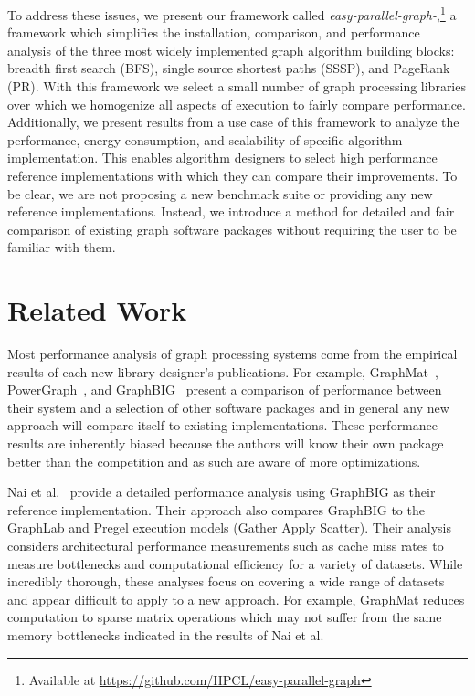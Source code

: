 \documentclass[conference]{IEEEtran}
\begin{document}
To address these issues, we present our framework called \mbox{\emph{easy-parallel-graph-\textasteriskcentered}},\footnote{Available at \url{https://github.com/HPCL/easy-parallel-graph}} a framework which simplifies the installation, comparison, and performance analysis of the three most widely implemented graph algorithm building blocks: breadth first search (BFS), single source shortest paths (SSSP), and PageRank (PR). With this framework we select a small number of graph processing libraries over which we homogenize all aspects of execution to fairly compare performance. Additionally, we present results from a use case of this framework to analyze the performance, energy consumption, and scalability of specific algorithm implementation. This enables algorithm designers to select high performance reference implementations with which they can compare their improvements. To be clear, we are not proposing a new benchmark suite or providing any new reference implementations. Instead, we introduce a method for detailed and fair comparison of existing graph software packages without requiring the user to be familiar with them.

\section{Related Work}\label{sec:relatedwork}
Most performance analysis of graph processing systems come from the empirical results of each new library designer's publications. For example, GraphMat~\cite{Sundaram:2015:GraphMat}, PowerGraph~\cite{Gonzalez:2012:Powergraph}, and GraphBIG~\cite{Nai:2015:Graphbig} present a comparison of performance between their system and a selection of other software packages and in general any new approach will compare itself to existing implementations. These performance results are inherently biased because the authors will know their own package better than the competition and as such are aware of more optimizations.

Nai et al.~\cite{Nai:2016:architectural} provide a detailed performance analysis using GraphBIG as their reference implementation. Their approach also compares GraphBIG to the GraphLab and Pregel execution models (Gather Apply Scatter). Their analysis considers architectural performance measurements such as cache miss rates to measure bottlenecks and computational efficiency for a variety of datasets. While incredibly thorough, these analyses focus on covering a wide range of datasets and appear difficult to apply to a new approach. For example, GraphMat reduces computation to sparse matrix operations which may not suffer from the same memory bottlenecks indicated in the results of Nai et al.
\end{document}
